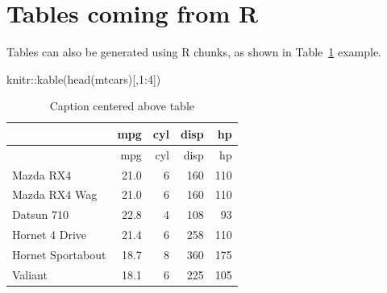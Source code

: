 \documentclass[
  authoryear,
  preprint,
  3p,
  twocolumn]{elsarticle}
\newenvironment{Shaded}{\begin{snugshade}}{\end{snugshade}}
\newcommand{\DecValTok}[1]{\textcolor[rgb]{0.68,0.00,0.00}{#1}}
\newcommand{\FunctionTok}[1]{\textcolor[rgb]{0.28,0.35,0.67}{#1}}
\newcommand{\NormalTok}[1]{\textcolor[rgb]{0.00,0.23,0.31}{#1}}
\newcommand{\SpecialCharTok}[1]{\textcolor[rgb]{0.37,0.37,0.37}{#1}}
\begin{document}
\hypertarget{tables-coming-from-r}{%
\section{Tables coming from R}\label{tables-coming-from-r}}

Tables can also be generated using R chunks, as shown in
Table~\ref{tbl-simple} example.

\begin{Shaded}
\begin{Highlighting}[]
\NormalTok{knitr}\SpecialCharTok{::}\FunctionTok{kable}\NormalTok{(}\FunctionTok{head}\NormalTok{(mtcars)[,}\DecValTok{1}\SpecialCharTok{:}\DecValTok{4}\NormalTok{])}
\end{Highlighting}
\end{Shaded}

\hypertarget{tbl-simple}{}
\begin{longtable}[]{@{}lrrrr@{}}
\caption{\label{tbl-simple}Caption centered above table}\tabularnewline
\toprule\noalign{}
& mpg & cyl & disp & hp \\
\midrule\noalign{}
\endfirsthead
\toprule\noalign{}
& mpg & cyl & disp & hp \\
\midrule\noalign{}
\endhead
\bottomrule\noalign{}
\endlastfoot
Mazda RX4 & 21.0 & 6 & 160 & 110 \\
Mazda RX4 Wag & 21.0 & 6 & 160 & 110 \\
Datsun 710 & 22.8 & 4 & 108 & 93 \\
Hornet 4 Drive & 21.4 & 6 & 258 & 110 \\
Hornet Sportabout & 18.7 & 8 & 360 & 175 \\
Valiant & 18.1 & 6 & 225 & 105 \\
\end{longtable}


\renewcommand\refname{References}
  
\end{document}
